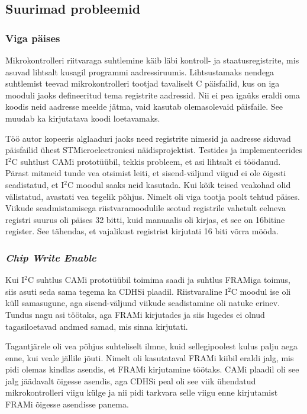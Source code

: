 \documentclass[12pt,a4paper]{article}
\newcommand{\iic}{I\({}^2\)C }
\begin{document}
\subsection{Suurimad probleemid}
\subsubsection{Viga päises}
Mikrokontrolleri riitvaraga suhtlemine käib läbi kontroll- ja staatusregistrite,
mis asuvad lihtsalt kusagil programmi aadressiruumis. Lihtsustamaks nendega
suhtlemist teevad mikrokontrolleri tootjad tavaliselt C päisfailid, kus on iga
mooduli jaoks defineeritud tema registrite aadressid. Nii ei pea igaüks eraldi
oma koodis neid aadresse meelde jätma, vaid kasutab olemasolevaid päisfaile. See
muudab ka kirjutatava koodi loetavamaks.

Töö autor kopeeris alglaaduri jaoks need registrite nimesid ja aadresse siduvad
päisfailid ühest STMicroelectronicsi näidisprojektist. Testides ja
implementeerides \iic suhtlust CAMi prototüübil, tekkis probleem, et asi
lihtsalt ei töödanud. Pärast mitmeid tunde vea otsimist leiti, et
sisend-väljund viigud ei ole õigesti seadistatud, et \iic moodul saaks neid
kasutada. Kui kõik teised veakohad olid välistatud, avastati vea tegelik põhjus.
Nimelt oli viga tootja poolt tehtud päises. Viikude seadmistamisega
riistvaramoodulile seotud registrile vahetult eelneva registri suurus oli päises
32 bitti, kuid manuaalis oli kirjas, et see on 16bitine register. See tähendas,
et vajalikust registrist kirjutati 16 biti võrra mööda. 
\subsubsection{\textit{Chip Write Enable}}
Kui \iic suhtlus CAMi prototüübil toimima saadi ja suhtlus FRAMiga toimus, siis
asuti seda sama tegema ka CDHSi plaadil. Riistvaraline \iic moodul ise oli küll
samasugune, aga sisend-väljund viikude seadistamine oli natuke erinev. Tundus
nagu asi töötaks, aga FRAMi kirjutades ja siis lugedes ei olnud tagasiloetavad
andmed samad, mis sinna kirjutati.

Tagantjärele oli vea põhjus suhteliselt ilmne, kuid sellegipoolest kulus palju
aega enne, kui veale jällile jõuti. Nimelt oli kasutataval FRAMi kiibil eraldi
jalg, mis pidi olemas kindlas asendis, et FRAMi kirjutamine töötaks. CAMi
plaadil oli see jalg jäädavalt õigesse asendis, aga CDHSi peal oli see viik
ühendatud mikrokontrolleri viigu külge ja nii pidi tarkvara selle viigu enne
kirjutamist FRAMi õigesse asendisse panema.
\end{document}
